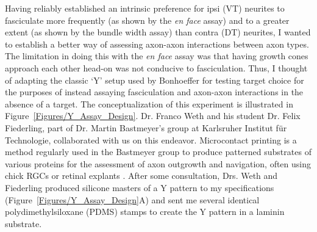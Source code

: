 Having reliably established an intrinsic preference for ipsi (VT) neurites to fasciculate more frequently (as shown by the \emph{en face} assay) and to a greater extent (as shown by the bundle width assay) than contra (DT) neurites, I wanted to establish a better way of assessing axon-axon interactions between axon types.
The limitation in doing this with the \emph{en face} assay was that having growth cones approach each other head-on was not conducive to fasciculation.
Thus, I thought of adapting the classic `Y' setup used by Bonhoeffer for testing target choice \cite{bonhoeffer1985position} for the purposes of instead assaying fasciculation and axon-axon interactions in the absence of a target.
The conceptualization of this experiment is illustrated in Figure~\ref{Figures/Y_Assay_Design}.
Dr. Franco Weth and his student Dr. Felix Fiederling, part of Dr. Martin Bastmeyer's group at Karlsruher Institut f\"ur Technologie, collaborated with us on this endeavor.
Microcontact printing is a method regularly used in the Bastmeyer group to produce patterned substrates of various proteins for the assessment of axon outgrowth and navigation, often using chick RGCs or retinal explants \cite{von2006microcontact}.
After some consultation, Drs. Weth and Fiederling produced silicone masters of a Y pattern to my specifications (Figure~\ref{Figures/Y_Assay_Design}A) and sent me several identical polydimethylsiloxane (PDMS) stamps to create the Y pattern in a laminin substrate.

